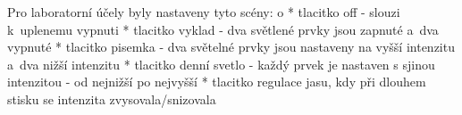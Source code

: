\medskip
\noindent
{\sbf Pro laboratorní účely byly nastaveny tyto scény:}
\begitems \style o
* tlacitko off - slouzi k~uplenemu vypnuti
* tlacitko vyklad - dva světlené prvky jsou zapnuté a~dva vypnuté
* tlacitko pisemka - dva světelné prvky jsou nastaveny na vyšší intenzitu a~dva nižší intenzitu
* tlacitko denní svetlo - každý prvek je nastaven s sjinou intenzitou - od nejnižší po nejvyšší
* tlacitko regulace jasu, kdy při dlouhem stisku se intenzita zvysovala/snizovala
\enditems









